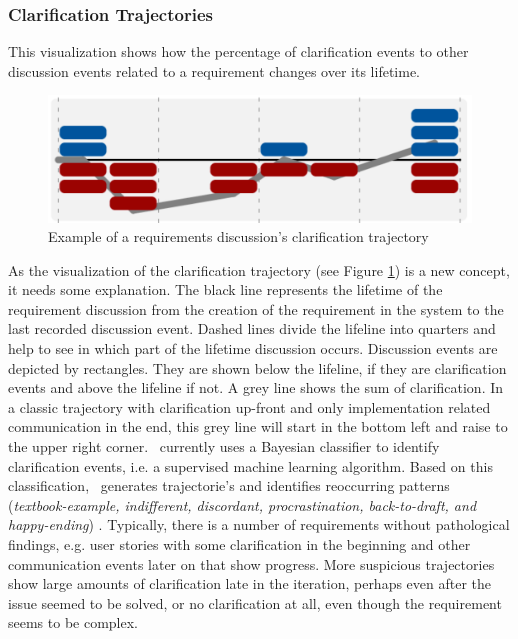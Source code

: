 \subsubsection{Clarification Trajectories} 
This visualization shows how the percentage of clarification events to other discussion events related to a requirement changes over its lifetime.
\begin{figure}[b]
\centering
\includegraphics[width=0.51\columnwidth]{img/example-trajectory}
\caption{Example of a requirements discussion's clarification trajectory}
\label{fig:example-trajectory}
\end{figure}
As the visualization of the clarification trajectory (see Figure \ref{fig:example-trajectory}) is a new concept, it needs some explanation.
The black line represents the lifetime of the requirement discussion from the creation of the requirement in the system to the last recorded discussion event.
Dashed lines divide the lifeline into quarters and help to see in which part of the lifetime discussion occurs.
Discussion events are depicted by rectangles.
They are shown below the lifeline, if they are clarification events and above the lifeline if not.
A grey line shows the sum of clarification.
In a classic trajectory with clarification up-front and only implementation related communication in the end, this grey line will start in the bottom left and raise to the upper right corner.
\viss\ currently uses a Bayesian classifier to identify clarification events, i.e. a supervised machine learning algorithm.
Based on this classification, \viss\ generates trajectorie's and identifies reoccurring patterns (\emph{textbook-example, indifferent, discordant, procrastination, back-to-draft, and happy-ending}) \cite{Knauss2012f}.
Typically, there is a number of requirements without pathological findings, e.g. user stories with some clarification in the beginning and other communication events later on that show progress.
More suspicious trajectories show large amounts of clarification late in the iteration, perhaps even after the issue seemed to be solved, or no clarification at all, even though the requirement seems to be complex.
